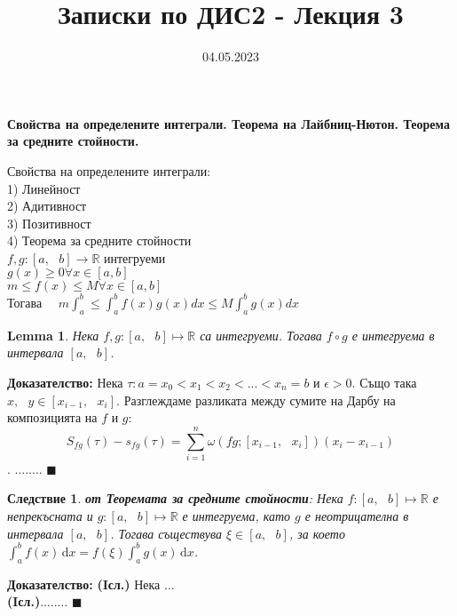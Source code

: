 \documentclass[12pt]{article}
\newtheorem{corollary}{Следствие}
\newtheorem{lemma}{Lemma}
\newcommand{\spc}{\text{ }}
\begin{document}
	\color{white}
	\pagecolor{darkgray}
	\title{Записки по ДИС2 - Лекция 3}
	\date{04.05.2023}
	\maketitle
	\begin{center}
		\Large
		\textbf{Свойства на определените интеграли. Теорема на Лайбниц-Нютон. Теорема за средните стойности.}
	\end{center}

	$\spc$\\
	Свойства на определените интеграли:\\
	1) Линейност\\
	2) Адитивност\\
	3) Позитивност\\
	4) Теорема за средните стойности\\
	$\spc$\\
	$f,g: \left[a,\spc b\right] \rightarrow \mathbb{R}$ интегруеми\\
	$g(x) \geq 0 \forall x \in [a,b]$\\
	$m \leq f(x) \leq M \forall x \in [a,b]$\\
	Тогава $\quad m\int_{a}^{b}\leq \int_{a}^{b}f(x)g(x)dx\leq M\int_{a}^{b}g(x)dx$\\
	
	\begin{lemma}
		Нека $f,g: \left[a,\spc b\right] \mapsto \mathbb{R}$ са интегруеми. Тогава $f\circ g$ е интегруема в интервала $\left[a,\spc b\right]$.
	\end{lemma}
	\textbf{Доказателство:} Нека $\tau : a=x_{0}<x_{1}<x_{2}<...<x_{n}=b$ и $\epsilon>0$. Също така $x,\spc y\in\left[x_{i-1},\spc x_{i}\right]$. Разглеждаме разликата между сумите на Дарбу на композицията на $f$ и $g$:
	\[S_{fg}(\tau)-s_{fg}(\tau)=\sum_{i=1}^{n}\omega (fg;\left[x_{i-1},\spc x_{i}\right])(x_{i} - x_{i-1})\].
	........
	$\blacksquare$
	
	\begin{corollary}
		\textbf{от Теоремата за средните стойности}: Нека $f: \left[a,\spc b\right] \mapsto \mathbb{R}$ е непрекъсната и $g: \left[a,\spc b\right] \mapsto \mathbb{R}$ е интегруема, като $g$ е неотрицателна в интервала $\left[a,\spc b\right]$. Тогава съществува $\xi\in\left[a,\spc b\right]$, за което $\int_{a}^{b} f(x)\,\mathrm{d}x = f(\xi)\int_{a}^{b} g(x)\,\mathrm{d}x$.
	\end{corollary}
	\textbf{Доказателство:} \textbf{(Iсл.)} Нека ...\\
	\textbf{(Iсл.)}........
	$\blacksquare$
	
\end{document}
